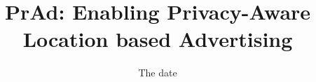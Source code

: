 \documentclass{sig-alternate}
\begin{document}
\sloppy
\title{PrAd: Enabling Privacy-Aware Location based Advertising}
\date{The date}
\maketitle
\setlength{\abovecaptionskip}{0.2cm}
\setlength{\belowcaptionskip}{-0.2cm}
\setlength{\belowdisplayskip}{-0.2cm}
\renewcommand{\baselinestretch}{1.5}
\setlength{\parskip}{0.2cm plus1mm minus1mm}

















%


\end{document}
